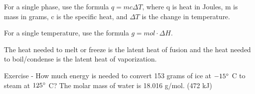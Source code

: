 \documentclass[../hchem.tex]{subfiles}
\begin{document}
For a single phase, use the formula $q=mc\Delta T$, where q is heat in Joules, m is mass in grams, c is the specific heat, and $\Delta T$ is the change in temperature.

For a single temperature, use the formula $g= mol\cdot\Delta H$.

The heat needed to melt or freeze is the latent heat of fusion and the heat needed to boil/condense is the latent heat of vaporization.

Exercise - How much energy is needed to convert 153 grams of ice at $-15\degree$ C to steam at $125\degree$ C? The molar mass of water is 18.016 g/mol. (472 kJ)
\end{document}
